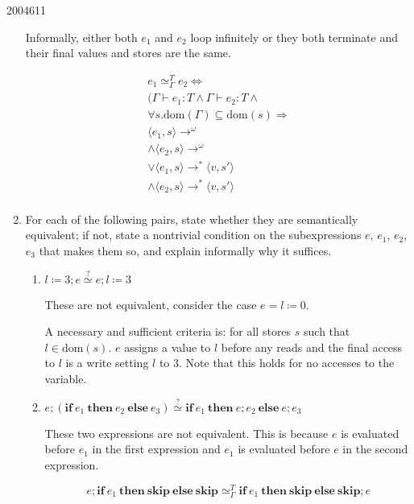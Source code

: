 \documentclass[10pt,\jkfside,a4paper]{article}
\begin{document}
\begin{examquestion}{2004}{6}{11}
\begin{enumerate}
Informally, either both $e_1$ and $e_2$ loop infinitely or they both
terminate and their final values and stores are the same.

\[
\begin{split}
e_1 \simeq^T_{\Gamma} e_2 \Longleftrightarrow \\
(\Gamma \vdash e_1 : T \wedge \Gamma \vdash e_2 : T \wedge \\
\forall s. \text{dom}(\Gamma) \subseteq \text{dom}(s) \Longrightarrow \\
\langle e_1, s \rangle \longrightarrow^{\omega} \\
\wedge \langle e_2, s \rangle \longrightarrow^{\omega} \\
\vee \langle e_1, s \rangle \longrightarrow^* \langle v, s' \rangle \\
\wedge \langle e_2, s \rangle \longrightarrow^* \langle v, s' \rangle \\
\end{split}
\]

\item For each of the following pairs, state whether they are semantically
equivalent; if not, state a nontrivial condition on the subexpressions $e$,
$e_1$, $e_2$, $e_3$ that makes them so, and explain informally why it suffices.

\begin{enumerate}

\item  $l \coloneqq 3; e \stackrel{?}{\simeq} e; l \coloneqq 3$

These are not equivalent, consider the case $e = l \coloneqq 0$.

A necessary and sufficient criteria is: for all stores $s$ such that $l\in
\text{dom}(s)$. $e$ assigns a value to $l$ before any reads and the final
access to $l$ is a write setting $l$ to 3. Note that this holds for no
accesses to the variable.

\item $e; (\mathbf{if} \ e_1 \ \mathbf{then} \ e_2 \ \mathbf{else} \ e_3)
\stackrel{?}{\simeq} \mathbf{if} \ e_1 \ \mathbf{then} \ e; e_2 \
\mathbf{else} \ e; e_3$

These two expressions are not equivalent. This is because $e$ is evaluated
before $e_1$ in the first expression and $e_1$ is evaluated before $e$ in
the second expression.

\[
e; \mathbf{if} \ e_1 \ \mathbf{then} \ \mathbf{skip} \ \mathbf{else} \
\mathbf{skip} \simeq^T_{\Gamma} \mathbf{if} \ e_1 \ \mathbf{then} \
\mathbf{skip} \ \mathbf{else} \ \mathbf{skip}; e
\]


\end{enumerate}
\end{enumerate}
\end{examquestion}
\end{document}
